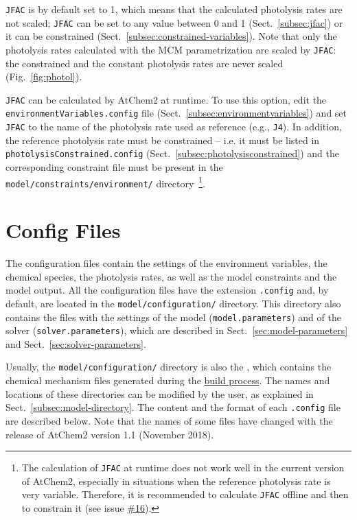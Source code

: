 \texttt{JFAC} is by default set to 1, which means that the calculated
photolysis rates are not scaled; \texttt{JFAC} can be set to any value
between 0 and 1 (Sect.~\ref{subsec:jfac}) or it can be constrained
(Sect.~\ref{subsec:constrained-variables}). Note that only the
photolysis rates calculated with the MCM parametrization are scaled by
\texttt{JFAC}: the constrained and the constant photolysis rates are
never scaled (Fig.~\ref{fig:photol}).

\texttt{JFAC} can be calculated by AtChem2 at runtime. To use this
option, edit the \texttt{environmentVariables.config} file
(Sect.~\ref{subsec:environmentvariables}) and set \texttt{JFAC} to the
name of the photolysis rate used as reference (e.g., \texttt{J4}). In
addition, the reference photolysis rate must be constrained -- i.e.
it must be listed in \texttt{photolysisConstrained.config}
(Sect.~\ref{subsec:photolysisconstrained}) and the corresponding
constraint file must be present in the
\texttt{model/constraints/environment/} directory~\footnote{The
  calculation of \texttt{JFAC} at runtime does not work well in the
  current version of AtChem2, especially in situations when the
  reference photolysis rate is very variable. Therefore, it is
  recommended to calculate \texttt{JFAC} offline and then to constrain it
  (see issue \href{https://github.com/AtChem/AtChem2/issues/16}{\#16}).}.

\section{Config Files} \label{sec:config-files}

The configuration files contain the settings of the environment
variables, the chemical species, the photolysis rates, as well as the
model constraints and the model output. All the configuration files
have the extension \texttt{.config} and, by default, are located in
the \texttt{model/configuration/} directory. This directory also
contains the files with the settings of the model
(\texttt{model.parameters}) and of the solver
(\texttt{solver.parameters}), which are described in
Sect.~\ref{sec:model-parameters} and Sect.~\ref{sec:solver-parameters}.

Usually, the \texttt{model/configuration/} directory is also the
\sharedir, which contains the chemical mechanism files generated
during the \hyperref[subsec:build-process]{build process}. The names
and locations of these directories can be modified by the user, as
explained in Sect.~\ref{subsec:model-directory}. The content and the
format of each \texttt{.config} file are described below. Note that
the names of some files have changed with the release of AtChem2
version 1.1 (November 2018).

